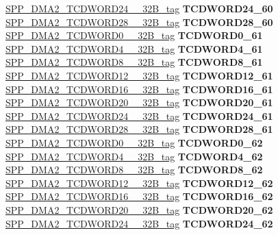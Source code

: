 \begin{DoxyCompactItemize}
\begin{tabbing}
\>\>\mbox{\hyperlink{unionSPP__DMA2__TCDWORD24____32B__tag}{SPP\_DMA2\_TCDWORD24\_\_32B\_tag}} {\bfseries TCDWORD24\_60}\\
\>\>\mbox{\hyperlink{unionSPP__DMA2__TCDWORD28____32B__tag}{SPP\_DMA2\_TCDWORD28\_\_32B\_tag}} {\bfseries TCDWORD28\_60}\\
\>\>\mbox{\hyperlink{unionSPP__DMA2__TCDWORD0____32B__tag}{SPP\_DMA2\_TCDWORD0\_\_32B\_tag}} {\bfseries TCDWORD0\_61}\\
\>\>\mbox{\hyperlink{unionSPP__DMA2__TCDWORD4____32B__tag}{SPP\_DMA2\_TCDWORD4\_\_32B\_tag}} {\bfseries TCDWORD4\_61}\\
\>\>\mbox{\hyperlink{unionSPP__DMA2__TCDWORD8____32B__tag}{SPP\_DMA2\_TCDWORD8\_\_32B\_tag}} {\bfseries TCDWORD8\_61}\\
\>\>\mbox{\hyperlink{unionSPP__DMA2__TCDWORD12____32B__tag}{SPP\_DMA2\_TCDWORD12\_\_32B\_tag}} {\bfseries TCDWORD12\_61}\\
\>\>\mbox{\hyperlink{unionSPP__DMA2__TCDWORD16____32B__tag}{SPP\_DMA2\_TCDWORD16\_\_32B\_tag}} {\bfseries TCDWORD16\_61}\\
\>\>\mbox{\hyperlink{unionSPP__DMA2__TCDWORD20____32B__tag}{SPP\_DMA2\_TCDWORD20\_\_32B\_tag}} {\bfseries TCDWORD20\_61}\\
\>\>\mbox{\hyperlink{unionSPP__DMA2__TCDWORD24____32B__tag}{SPP\_DMA2\_TCDWORD24\_\_32B\_tag}} {\bfseries TCDWORD24\_61}\\
\>\>\mbox{\hyperlink{unionSPP__DMA2__TCDWORD28____32B__tag}{SPP\_DMA2\_TCDWORD28\_\_32B\_tag}} {\bfseries TCDWORD28\_61}\\
\>\>\mbox{\hyperlink{unionSPP__DMA2__TCDWORD0____32B__tag}{SPP\_DMA2\_TCDWORD0\_\_32B\_tag}} {\bfseries TCDWORD0\_62}\\
\>\>\mbox{\hyperlink{unionSPP__DMA2__TCDWORD4____32B__tag}{SPP\_DMA2\_TCDWORD4\_\_32B\_tag}} {\bfseries TCDWORD4\_62}\\
\>\>\mbox{\hyperlink{unionSPP__DMA2__TCDWORD8____32B__tag}{SPP\_DMA2\_TCDWORD8\_\_32B\_tag}} {\bfseries TCDWORD8\_62}\\
\>\>\mbox{\hyperlink{unionSPP__DMA2__TCDWORD12____32B__tag}{SPP\_DMA2\_TCDWORD12\_\_32B\_tag}} {\bfseries TCDWORD12\_62}\\
\>\>\mbox{\hyperlink{unionSPP__DMA2__TCDWORD16____32B__tag}{SPP\_DMA2\_TCDWORD16\_\_32B\_tag}} {\bfseries TCDWORD16\_62}\\
\>\>\mbox{\hyperlink{unionSPP__DMA2__TCDWORD20____32B__tag}{SPP\_DMA2\_TCDWORD20\_\_32B\_tag}} {\bfseries TCDWORD20\_62}\\
\>\>\mbox{\hyperlink{unionSPP__DMA2__TCDWORD24____32B__tag}{SPP\_DMA2\_TCDWORD24\_\_32B\_tag}} {\bfseries TCDWORD24\_62}\\

\end{tabbing}
\end{DoxyCompactItemize}
